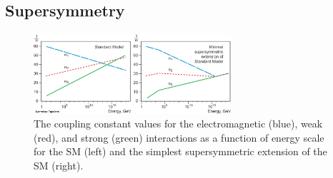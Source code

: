 \subsection{Supersymmetry\label{sec:SUSY}}

\begin{figure}[h!t]
  \begin{center}
       \includegraphics[width=0.65\textwidth,]{figures/phypub4highen.jpg}
       \caption{The coupling constant values for the electromagnetic (blue), weak (red), 
       and strong (green) interactions as a function of energy scale for the SM (left) and the simplest 
       supersymmetric extension of the SM (right).}
    \label{fig:runningConstants}
  \end{center}
\end{figure}


